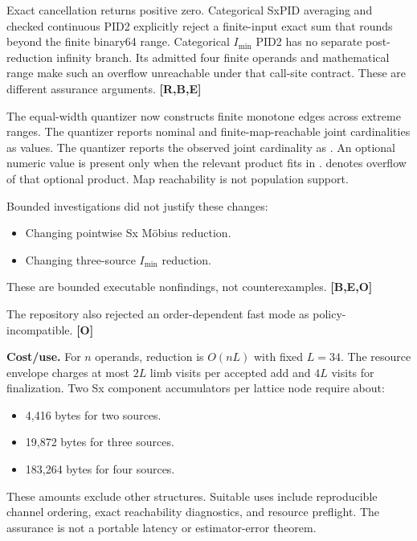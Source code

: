 \documentclass[
  11pt,
  a4paper,
]{article}
\providecommand{\tightlist}{%
  \setlength{\itemsep}{0pt}\setlength{\parskip}{0pt}}
\let\pidoldtexttt\texttt
\renewcommand{\texttt}[1]{\pidoldtexttt{\seqsplit{#1}}}%
\begin{document}
Exact cancellation returns positive zero. Categorical SxPID averaging
and checked continuous PID2 explicitly reject a finite-input exact sum
that rounds beyond the finite binary64 range. Categorical \(I_{\min}\)
PID2 has no separate post-reduction infinity branch. Its admitted four
finite operands and mathematical range make such an overflow unreachable
under that call-site contract. These are different assurance arguments.
\textbf{{[}R,B,E{]}}

The equal-width quantizer now constructs finite monotone edges across
extreme ranges. The quantizer reports nominal and finite-map-reachable
joint cardinalities as \texttt{Option\textless{}u128\textgreater{}}
values. The quantizer reports the observed joint cardinality as
\texttt{usize}. An optional numeric value is present only when the
relevant product fits in \texttt{u128}. \texttt{None} denotes overflow
of that optional product. Map reachability is not population support.

Bounded investigations did not justify these changes:

\begin{itemize}
\tightlist
\item
  Changing pointwise Sx Möbius reduction.
\item
  Changing three-source \(I_{\min}\) reduction.
\end{itemize}

These are bounded executable nonfindings, not counterexamples.
\textbf{{[}B,E,O{]}}

The repository also rejected an order-dependent fast mode as
policy-incompatible. \textbf{{[}O{]}}

\textbf{Cost/use.} For \(n\) operands, reduction is \(O(nL)\) with fixed
\(L=34\). The resource envelope charges at most \(2L\) limb visits per
accepted add and \(4L\) visits for finalization. Two Sx component
accumulators per lattice node require about:

\begin{itemize}
\tightlist
\item
  4,416 bytes for two sources.
\item
  19,872 bytes for three sources.
\item
  183,264 bytes for four sources.
\end{itemize}

These amounts exclude other structures. Suitable uses include
reproducible channel ordering, exact reachability diagnostics, and
resource preflight. The assurance is not a portable latency or
estimator-error theorem.
\end{document}
